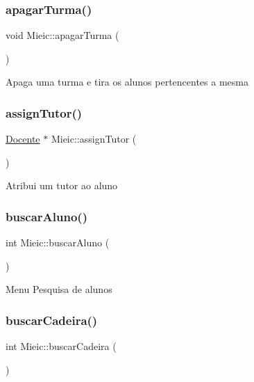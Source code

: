 \subsubsection{\texorpdfstring{apagar\+Turma()}{apagarTurma()}}
{\footnotesize\ttfamily void Mieic\+::apagar\+Turma (\begin{DoxyParamCaption}{ }\end{DoxyParamCaption})}

Apaga uma turma e tira os alunos pertencentes \textquotesingle{}a mesma \hypertarget{class_mieic_a24eb52b1a22b82785b6194d134a00e54}{}\label{class_mieic_a24eb52b1a22b82785b6194d134a00e54} 
\subsubsection{\texorpdfstring{assign\+Tutor()}{assignTutor()}}
{\footnotesize\ttfamily \hyperlink{class_docente}{Docente} $\ast$ Mieic\+::assign\+Tutor (\begin{DoxyParamCaption}{ }\end{DoxyParamCaption})}

Atribui um tutor ao aluno \hypertarget{class_mieic_a6f7e179dcb9cb355c86020b65a550a83}{}\label{class_mieic_a6f7e179dcb9cb355c86020b65a550a83} 
\subsubsection{\texorpdfstring{buscar\+Aluno()}{buscarAluno()}}
{\footnotesize\ttfamily int Mieic\+::buscar\+Aluno (\begin{DoxyParamCaption}{ }\end{DoxyParamCaption})}

Menu Pesquisa de alunos \hypertarget{class_mieic_ac63c0ee6a6edbbf7aaebdea568994905}{}\label{class_mieic_ac63c0ee6a6edbbf7aaebdea568994905} 
\subsubsection{\texorpdfstring{buscar\+Cadeira()}{buscarCadeira()}}
{\footnotesize\ttfamily int Mieic\+::buscar\+Cadeira (\begin{DoxyParamCaption}{ }\end{DoxyParamCaption})}

